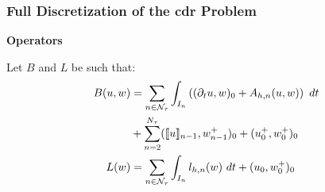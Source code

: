 \begin{frame}
    \frametitle{Full Discretization of the \acrshort{cdr} Problem}

    \vspace*{\fill}
    \begin{center}
        {\color{\accentcolor} \Large \textbf{Operators}}
        \vspace*{0.25cm}

        \begin{minipage}{0.75\textwidth}
            \begin{definition}
                Let $B$ and $L$ be such that:
                \begin{align*}
                    B(u, w) &= \sum_{n \in \mathcal{N}_{\tau}} \int_{I_n} \left( (\partial_t u, w )_0 + A_{h, n}(u, w) \right) ~ dt \\
                    &+ \sum_{n = 2}^{N_{\tau}} (\llbracket u \rrbracket_{n - 1}, w_{n - 1}^+ )_0 + (u_0^+, w_0^+ )_0\\
                    L(w) &= \sum_{n \in \mathcal{N}_{\tau}} \int_{I_n} l_{h, n}(w) ~ dt + (u_0, w_0^+ )_0
                \end{align*}
            \end{definition}
        \end{minipage}
    \end{center}
    \vspace*{\fill}
    
\end{frame}

